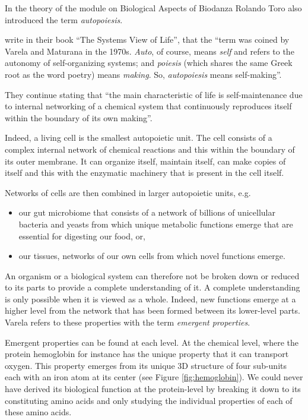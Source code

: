 \documentclass[
  11pt,
]{book}
\providecommand{\tightlist}{%
  \setlength{\itemsep}{0pt}\setlength{\parskip}{0pt}}
\begin{document}
In the theory of the module on Biological Aspects of Biodanza Rolando Toro also introduced the term \emph{autopoiesis}.

\citet{capraLuisi2014} write in their book ``The Systems View of Life'', that the ``term was coined by Varela and Maturana in the 1970s. \emph{Auto}, of course, means \emph{self} and refers to the autonomy of self-organizing systems; and \emph{poiesis} (which shares the same Greek root as the word poetry) means \emph{making}. So, \emph{autopoiesis} means self-making''.

They continue stating that ``the main characteristic of life is self-maintenance due to internal networking of a chemical system that continuously reproduces itself within the boundary of its own making''.

Indeed, a living cell is the smallest autopoietic unit.
The cell consists of a complex internal network of chemical reactions and this within the boundary of its outer membrane.
It can organize itself, maintain itself, can make copies of itself and this with the enzymatic machinery that is present in the cell itself.

Networks of cells are then combined in larger autopoietic units, e.g.~

\begin{itemize}
\tightlist
\item
  our gut microbiome that consists of a network of billions of unicellular bacteria and yeasts from which unique metabolic functions emerge that are essential for digesting our food, or,
\item
  our tissues, networks of our own cells from which novel functions emerge.
\end{itemize}

An organism or a biological system can therefore not be broken down or reduced to its parts to provide a complete understanding of it. A complete understanding is only possible when it is viewed as a whole.
Indeed, new functions emerge at a higher level from the network that has been formed between its lower-level parts. Varela refers to these properties with the term \emph{emergent properties}.

Emergent properties can be found at each level. At the chemical level, where the protein hemoglobin for instance has the unique property that it can transport oxygen. This property emerges from its unique 3D structure of four sub-units each with an iron atom at its center (see Figure \ref{fig:hemoglobin}). We could never have derived its biological function at the protein-level by breaking it down to its constituting amino acids and only studying the individual properties of each of these amino acids.
\end{document}
